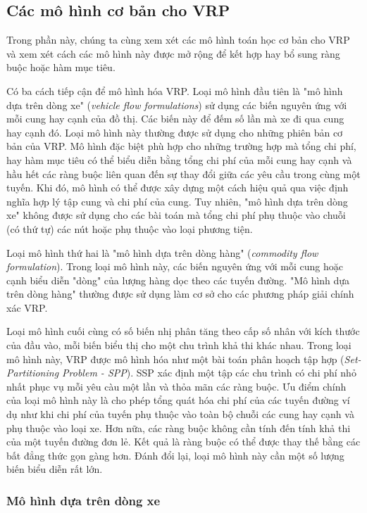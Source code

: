 \subsection{Các mô hình cơ bản cho VRP}
\label{sec:math_common}

Trong phần này, chúng ta cùng xem xét các mô hình toán học cơ bản cho VRP và xem xét cách các mô hình này được mở rộng để kết hợp hay bổ sung ràng buộc hoặc hàm mục tiêu.

Có ba cách tiếp cận để mô hình hóa VRP. Loại mô hình đầu tiên là "mô hình dựa trên dòng xe" (\textit{vehicle flow formulations}) sử dụng các biến nguyên ứng với mỗi cung hay cạnh của đồ thị. Các biến này để đếm số lần mà xe đi qua cung hay cạnh đó. Loại mô hình này thường được sử dụng cho những phiên bản cơ bản của VRP. Mô hình đặc biệt phù hợp cho những trường hợp mà tổng chi phí, hay hàm mục tiêu có thể biểu diễn bằng tổng chi phí của mỗi cung hay cạnh và hầu hết các ràng buộc liên quan đến sự thay đổi giữa các yêu cầu trong cùng một tuyến. Khi đó, mô hình có thể được xây dựng một cách hiệu quả qua việc định nghĩa hợp lý tập cung và chi phí của cung. Tuy nhiên, "mô hình dựa trên dòng xe" không được sử dụng cho các bài toán mà tổng chi phí phụ thuộc vào chuỗi (có thứ tự) các nút hoặc phụ thuộc vào loại phương tiện.

Loại mô hình thứ hai là "mô hình dựa trên dòng hàng" (\textit{commodity flow formulation}). Trong loại mô hình này, các biến nguyên ứng với mỗi cung hoặc cạnh biểu diễn "dòng" của lượng hàng dọc theo các tuyến đường. "Mô hình dựa trên dòng hàng" thường được sử dụng làm cơ sở cho các phương pháp giải chính xác VRP.

Loại mô hình cuối cùng có số biến nhị phân tăng theo cấp số nhân với kích thước của đầu vào, mỗi biến biểu thị cho một chu trình khả thi khác nhau. Trong loại mô hình này, VRP được mô hình hóa như một bài toán phân hoạch tập hợp (\textit{Set-Partitioning Problem - SPP}). SSP xác định một tập các chu trình có chi phí nhỏ nhất phục vụ mỗi yêu càu một lần và thỏa mãn các ràng buộc. Ưu điểm chính của loại mô hình này là cho phép tổng quát hóa chi phí của các tuyến đường ví dụ như khi chi phí của tuyến phụ thuộc vào toàn bộ chuỗi các cung hay cạnh và phụ thuộc vào loại xe. Hơn nữa, các ràng buộc không cần tính đến tính khả thi của một tuyến đường đơn lẻ. Kết quả là ràng buộc có thể được thay thế bằng các bất đẳng thức gọn gàng hơn. Đánh đổi lại, loại mô hình này cần một số lượng biến biểu diễn rất lớn.

\subsubsection*{Mô hình dựa trên dòng xe}

